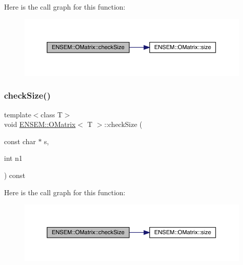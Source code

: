 Here is the call graph for this function\+:
\nopagebreak
\begin{figure}[H]
\begin{center}
\leavevmode
\includegraphics[width=350pt]{dd/d80/classENSEM_1_1OMatrix_a8e4c3a86b8055f6e67c8fd914b2898ca_cgraph}
\end{center}
\end{figure}
\mbox{\label{classENSEM_1_1OMatrix_a8e4c3a86b8055f6e67c8fd914b2898ca}} 
\subsubsection{\texorpdfstring{checkSize()}{checkSize()}\hspace{0.1cm}{\footnotesize\ttfamily [4/4]}}
{\footnotesize\ttfamily template$<$class T$>$ \\
void \mbox{\hyperlink{classENSEM_1_1OMatrix}{E\+N\+S\+E\+M\+::\+O\+Matrix}}$<$ T $>$\+::check\+Size (\begin{DoxyParamCaption}\item[{const char $\ast$}]{s,  }\item[{int}]{n1 }\end{DoxyParamCaption}) const\hspace{0.3cm}{\ttfamily [inline]}}

Here is the call graph for this function\+:
\nopagebreak
\begin{figure}[H]
\begin{center}
\leavevmode
\includegraphics[width=350pt]{dd/d80/classENSEM_1_1OMatrix_a8e4c3a86b8055f6e67c8fd914b2898ca_cgraph}
\end{center}
\end{figure}
\mbox{\label{classENSEM_1_1OMatrix_a0a15388ff6dc8159664f6dc14a35b399}} 
